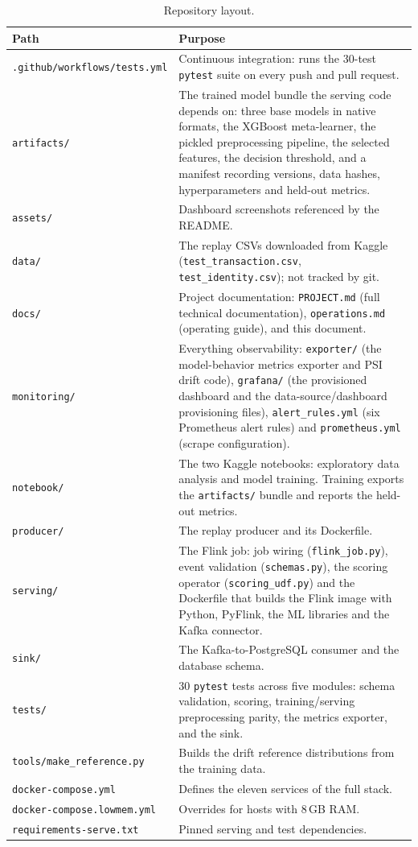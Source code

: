 \documentclass[11pt,a4paper]{article}
\newcommand{\code}[1]{\texttt{#1}}
\begin{document}
\begin{table}[h]
\centering
\small
\begin{tabular}{@{}p{}p{}@{}}
\toprule
Path & Purpose \\
\midrule
\code{.github/workflows/tests.yml} & Continuous integration: runs the 30-test
  \code{pytest} suite on every push and pull request. \\
\code{artifacts/} & The trained model bundle the serving code depends on:
  three base models in native formats, the XGBoost meta-learner, the pickled
  preprocessing pipeline, the selected features, the decision threshold, and a
  manifest recording versions, data hashes, hyperparameters and held-out
  metrics. \\
\code{assets/} & Dashboard screenshots referenced by the README. \\
\code{data/} & The replay CSVs downloaded from Kaggle
  (\code{test\_transaction.csv}, \code{test\_identity.csv}); not tracked by
  git. \\
\code{docs/} & Project documentation: \code{PROJECT.md} (full technical
  documentation), \code{operations.md} (operating guide), and this document. \\
\code{monitoring/} & Everything observability: \code{exporter/} (the
  model-behavior metrics exporter and PSI drift code), \code{grafana/}
  (the provisioned dashboard and the data-source/dashboard provisioning
  files), \code{alert\_rules.yml} (six Prometheus alert rules) and
  \code{prometheus.yml} (scrape configuration). \\
\code{notebook/} & The two Kaggle notebooks: exploratory data analysis and
  model training. Training exports the \code{artifacts/} bundle and reports
  the held-out metrics. \\
\code{producer/} & The replay producer and its Dockerfile. \\
\code{serving/} & The Flink job: job wiring (\code{flink\_job.py}), event
  validation (\code{schemas.py}), the scoring operator
  (\code{scoring\_udf.py}) and the Dockerfile that builds the Flink image with
  Python, PyFlink, the ML libraries and the Kafka connector. \\
\code{sink/} & The Kafka-to-PostgreSQL consumer and the database schema. \\
\code{tests/} & 30 \code{pytest} tests across five modules: schema validation,
  scoring, training/serving preprocessing parity, the metrics exporter, and
  the sink. \\
\code{tools/make\_reference.py} & Builds the drift reference distributions
  from the training data. \\
\code{docker-compose.yml} & Defines the eleven services of the full stack. \\
\code{docker-compose.lowmem.yml} & Overrides for hosts with 8\,GB RAM. \\
\code{requirements-serve.txt} & Pinned serving and test dependencies. \\
\bottomrule
\end{tabular}
\caption{Repository layout.}
\end{table}
\end{document}

